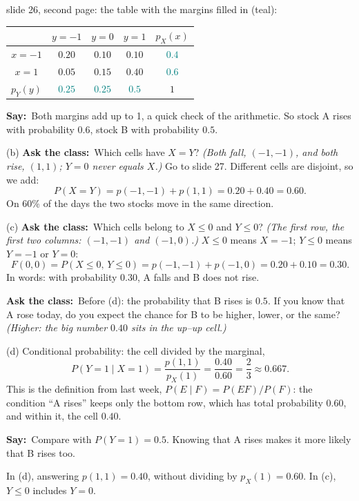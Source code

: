 \documentclass[11pt,a4paper,parskip=half]{scrartcl}
\renewcommand{\needspace}[1]{\Needspace{6\baselineskip}}
\newcommand{\say}{\textbf{\color{teal}Say:}\ }
\newcommand{\ask}{\textbf{\color{navy}Ask the class:}\ }
\begin{document}
\needspace{0.2\textheight}
\begin{slidefig}
	slide 26, second page: the table with the margins filled in (teal):
	\begin{center}
		\renewcommand{\arraystretch}{1.25}
		\begin{tabular}{c|ccc|c}
			       & $y=-1$ & $y=0$  & $y=1$  & $p_X(x)$ \\
			\hline
			$x=-1$ & $0.20$ & $0.10$ & $0.10$ & \textcolor{teal}{$0.4$} \\
			$x=1$  & $0.05$ & $0.15$ & $0.40$ & \textcolor{teal}{$0.6$} \\
			\hline
			$p_Y(y)$ & \textcolor{teal}{$0.25$} & \textcolor{teal}{$0.25$}
			& \textcolor{teal}{$0.5$} & $1$
		\end{tabular}
	\end{center}
\end{slidefig}

\say Both margins add up to 1, a quick check of the arithmetic. So stock A
rises with probability $0.6$, stock B with probability $0.5$.

(b) \ask Which cells have $X=Y$? \emph{(Both fall, $(-1,-1)$, and both
rise, $(1,1)$; $Y=0$ never equals $X$.)} Go to slide 27. Different cells
are disjoint, so we add:
\[ P(X=Y)=p(-1,-1)+p(1,1)=0.20+0.40=0.60. \]
On 60\% of the days the two stocks move in the same direction.

(c) \ask Which cells belong to $X\le0$ and $Y\le0$? \emph{(The first row,
the first two columns: $(-1,-1)$ and $(-1,0)$.)} $X\le0$ means $X=-1$;
$Y\le0$ means $Y=-1$ or $Y=0$:
\[ F(0,0)=P(X\le0,\,Y\le0)=p(-1,-1)+p(-1,0)=0.20+0.10=0.30. \]
In words: with probability $0.30$, A falls and B does not rise.

\ask Before (d): the probability that B rises is $0.5$. If you know that
A rose today, do you expect the chance for B to be higher, lower, or the
same? \emph{(Higher: the big number $0.40$ sits in the up--up cell.)}

(d) Conditional probability: the cell divided by the marginal,
\[ P(Y=1\mid X=1)=\frac{p(1,1)}{p_X(1)}=\frac{0.40}{0.60}=\frac23
	\approx0.667. \]
This is the definition from last week, $P(E\mid F)=P(EF)/P(F)$: the
condition ``A rises'' keeps only the bottom row, which has total
probability $0.60$, and within it, the cell $0.40$.

\say Compare with $P(Y=1)=0.5$. Knowing that A rises makes it more likely
that B rises too.

\begin{mistake}
	In (d), answering $p(1,1)=0.40$, without dividing by $p_X(1)=0.60$. In
	(c), $Y\le0$ includes $Y=0$.
\end{mistake}
\end{document}
